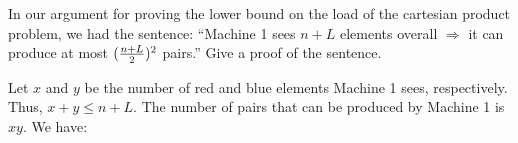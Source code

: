  In our argument for proving the lower bound on the load of the cartesian product problem, we had the sentence: ``Machine 1 sees $n + L$ elements overall $\Rightarrow$ it can produce at most $(\frac{n+L}{2})^2$ pairs.'' Give a proof of the sentence.

\begin{sol}
    Let $x$ and $y$ be the number of red and blue elements Machine 1 sees, respectively. Thus, $x + y \le n + L$. The number of pairs that can be produced by Machine 1 is $xy$. We have: 
\end{sol}

